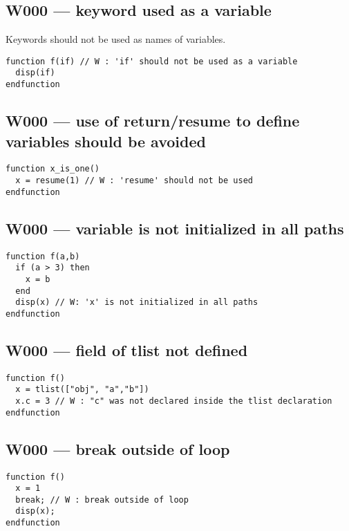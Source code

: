 \subsection{W000 --- keyword used as a variable}




Keywords should not be used as names of variables.

\begin{verbatim}
function f(if) // W : 'if' should not be used as a variable
  disp(if)
endfunction
\end{verbatim}


\subsection{W000 --- use of return/resume to define variables should be avoided}


\begin{verbatim}
function x_is_one()
  x = resume(1) // W : 'resume' should not be used
endfunction
\end{verbatim}


\subsection{W000 --- variable is not initialized in all paths}


\begin{verbatim}
function f(a,b)
  if (a > 3) then
    x = b
  end
  disp(x) // W: 'x' is not initialized in all paths
endfunction
\end{verbatim}


\subsection{W000 --- field of tlist not defined}


\begin{verbatim}
function f()
  x = tlist(["obj", "a","b"])
  x.c = 3 // W : "c" was not declared inside the tlist declaration
endfunction
\end{verbatim}


\subsection{W000 --- break outside of loop}


\begin{verbatim}
function f()
  x = 1
  break; // W : break outside of loop
  disp(x);
endfunction
\end{verbatim}


